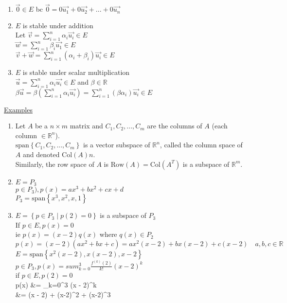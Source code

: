 \documentclass[12pt]{article}
\renewcommand{\v}[1]{\overrightarrow{#1}}
\newcommand{\real}[0]{\mathbb{R}}
\newenvironment{examples}{\underline{Examples}\begin{enumerate}}{\end{enumerate}}
\newcommand{\bb}[1]{\left\{#1\right\}}
\newcommand{\ssum}[0]{\sum_{i=1}^n}
\newcommand{\sspan}[1]{\text{span}\bb{#1}}
\newenvironment{eqn}{\equation\alignedat{3}}{\endalignedat\endequation}
\begin{document}
	\begin{enumerate}
		\item $\v{0} \in E$ bc $\v{0} = 0 \v{u_1} + 0 \v{u_2} + ... + 0 \v{u_n}$
		\item $E$ is stable under addition \\
		Let $\v{v} = \sum_{i=1}^n \alpha_i \v{u_i} \in E$ \\
		$\v{w} = \sum_{i=1}^n \beta_i \v{u_1} \in E$ \\
		$\v{v} + \v{w} = \sum_{i=1}^n (\alpha_i + \beta_i) \v{u_i} \in E$
		\item $E$ is stable under scalar multiplication \\
		$\v{u} =  \ssum \alpha_i \v{u_i} \in E$ and $\beta \in \real$ \\
		$\beta \v{u} = \beta(\ssum \alpha_i \v{u_i}) = \sum_{i=1}^n (\beta \alpha_i) \v{u_i} \in E$
	\end{enumerate}
	
	
	\begin{examples}
		\item Let $A$ be a $n \times m$ matrix and $C_1, C_2, ..., C_m$ are the columns of $A$ (each column $\in \real^n$). \\
		$\sspan{C_1, C_2, ..., C_m}$ is a vector subspace of $\real^n$, called the column space of $A$ and denoted $\text{Col}(A) n$. \\
		Similarly, the row space of $A$ is $\text{Row}(A) = \text{Col}(A^T)$ is a subspace of $\real^m$.
		
		\item $E = P_3$ \\
		$p \in P_3), p(x) = ax^3 + bx^2 + cx + d$ \\
		$P_3 = \sspan{x^3, x^2, x, 1}$		
		
		\item $E = \bb{p \in P_3 \mid p(2) = 0}$ is a subspace of $P_3$ \\
		If $p \in E, p(x) = 0$ \\
		ie $p(x) = (x - 2)q(x)$ where $q(x) \in P_2$ \\
		$p(x) = (x - 2)(ax^2 + bx + c) = ax^2(x - 2) + bx(x - 2) + c(x - 2) \quad a, b, c \in \real$ \\
		$E = \sspan{x^2(x - 2), x(x - 2), x - 2}$ \\
		$p \in P_3, p(x) = sum_{k=0}^3 \frac{f^{(k)}(2)}{k!} (x - 2)^k$ \\
		if $p \in E, p(2) = 0$ \\
		\begin{eqn}
			p(x) &= \sum_{k=0}^3  (x - 2)^k \\
			&= (x - 2) + (x-2)^2 + (x-2)^3
		\end{eqn}
	\end{examples}
	
\end{document}
